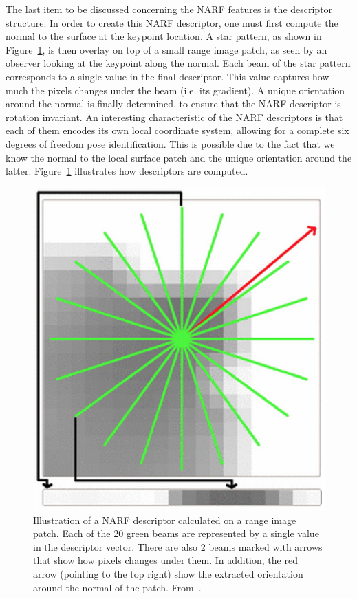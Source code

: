 
The last item to be discussed concerning the NARF features is the descriptor structure. In order to create this NARF descriptor, one must first compute the normal to the surface at the keypoint location. A star pattern, as shown in Figure~\ref{fig:narf_descriptor}, is then overlay on top of a small range image patch, as seen by an observer looking at the keypoint along the normal. Each beam of the star pattern corresponds to a single value in the final descriptor. This value captures how much the pixels changes under the beam (i.e. its gradient). A unique orientation around the normal is finally determined, to ensure that the NARF descriptor is rotation invariant. An interesting characteristic of the NARF descriptors is that each of them encodes its own local coordinate system, allowing for a complete six degrees of freedom pose identification. This is possible due to the fact that we know the normal to the local surface patch and the unique orientation around the latter. Figure~\ref{fig:narf_descriptor} illustrates how descriptors are computed.

\begin{figure}[H]
    \centering
    \includegraphics[width=0.4\linewidth]{img/chap_slam/narf.png}
    \caption[Illustration of a NARF descriptor calculated on a range image patch.]{Illustration of a NARF descriptor calculated on a range image patch. Each of the 20 green beams are represented by a single value in the descriptor vector. There are also 2 beams marked with arrows that show how pixels changes under them. In addition, the red arrow (pointing to the top right) show the extracted orientation around the normal of the patch. From~\cite{Steder2011a}.}
    \label{fig:narf_descriptor}
\end{figure}



